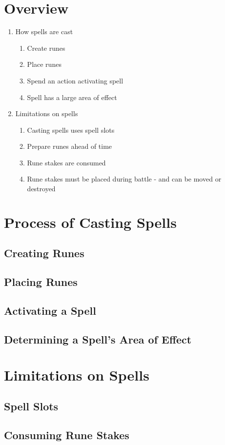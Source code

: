 \section{Overview}

\begin{enumerate}
    \item How spells are cast
    \begin{enumerate}
        \item Create runes
        \item Place runes
        \item Spend an action activating spell
        \item Spell has a large area of effect
    \end{enumerate}
    \item Limitations on spells
    \begin{enumerate}
        \item Casting spells uses spell slots
        \item Prepare runes ahead of time
        \item Rune stakes are consumed
        \item Rune stakes must be placed during battle - and can be moved or destroyed
    \end{enumerate}
\end{enumerate}

\section{Process of Casting Spells}

\subsection{Creating Runes}

\subsection{Placing Runes}

\subsection{Activating a Spell}

\subsection{Determining a Spell's Area of Effect}

\section{Limitations on Spells}

\subsection{Spell Slots}

\subsection{Consuming Rune Stakes}